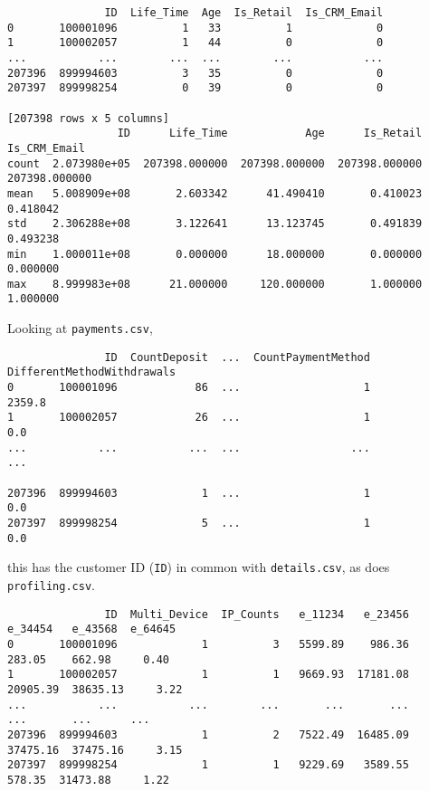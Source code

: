 \documentclass[11pt]{article} %
\begin{document}
\small
{\color{blue}
\begin{verbatim}
               ID  Life_Time  Age  Is_Retail  Is_CRM_Email
0       100001096          1   33          1             0
1       100002057          1   44          0             0
...           ...        ...  ...        ...           ...
207396  899994603          3   35          0             0
207397  899998254          0   39          0             0

[207398 rows x 5 columns]
                 ID      Life_Time            Age      Is_Retail   Is_CRM_Email
count  2.073980e+05  207398.000000  207398.000000  207398.000000  207398.000000
mean   5.008909e+08       2.603342      41.490410       0.410023       0.418042
std    2.306288e+08       3.122641      13.123745       0.491839       0.493238
min    1.000011e+08       0.000000      18.000000       0.000000       0.000000
max    8.999983e+08      21.000000     120.000000       1.000000       1.000000
\end{verbatim}
}
\normalsize

Looking at {\tt payments.csv},
\small
{\color{blue}
\begin{verbatim}
               ID  CountDeposit  ...  CountPaymentMethod  DifferentMethodWithdrawals
0       100001096            86  ...                   1                      2359.8
1       100002057            26  ...                   1                         0.0
...           ...           ...  ...                 ...                         ...

207396  899994603             1  ...                   1                         0.0
207397  899998254             5  ...                   1                         0.0
\end{verbatim}
}
\normalsize
this has the customer ID ({\tt ID}) in common with {\tt details.csv}, as does {\tt profiling.csv}.
\newpage
\small
{\color{blue}
\begin{verbatim} 
               ID  Multi_Device  IP_Counts   e_11234   e_23456   e_34454   e_43568  e_64645
0       100001096             1          3   5599.89    986.36    283.05    662.98     0.40
1       100002057             1          1   9669.93  17181.08  20905.39  38635.13     3.22
...           ...           ...        ...       ...       ...       ...       ...      ...
207396  899994603             1          2   7522.49  16485.09  37475.16  37475.16     3.15
207397  899998254             1          1   9229.69   3589.55    578.35  31473.88     1.22
\end{verbatim}
}
\normalsize
\end{document}
